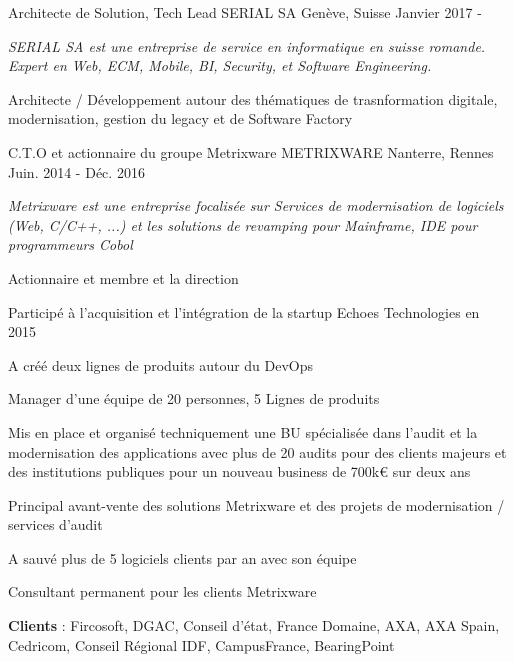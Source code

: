 

\begin{cventries}
\cventry
{Architecte de Solution, Tech Lead} %
{SERIAL SA} %
{Genève, Suisse} %
{Janvier 2017 - } %
{
	\begin{cvitems} %
		\item {\textit{SERIAL SA est une entreprise de service en informatique en suisse romande. Expert en Web, ECM, Mobile, BI, Security, et Software Engineering.}}
		\item {Architecte / Développement autour des thématiques de trasnformation digitale, modernisation, gestion du legacy et de Software Factory}
	\end{cvitems}
}
  \cventry
    {C.T.O et actionnaire du groupe Metrixware} %
    {METRIXWARE} %
    {Nanterre, Rennes} %
    {Juin. 2014 - Déc. 2016} %
    {
      \begin{cvitems} %
        \item {\textit{Metrixware est une entreprise focalisée sur Services de modernisation de logiciels (Web, C/C++, ...) et les solutions de revamping pour Mainframe, IDE pour programmeurs Cobol}}
        \item {Actionnaire et membre et la direction}
        \item {Participé à l'acquisition et l'intégration de la startup Echoes Technologies en 2015}
        \item {A créé deux lignes de produits autour du DevOps}
        \item {Manager d'une équipe de 20 personnes, 5 Lignes de produits}
        \item {Mis en place et organisé techniquement une BU spécialisée dans l'audit et la modernisation des applications avec plus de 20 audits pour des clients majeurs et des institutions publiques pour un nouveau business de 700k€ sur deux ans}
        \item {Principal avant-vente des solutions Metrixware et des projets de modernisation / services d'audit}
        \item {A sauvé plus de 5 logiciels clients par an avec son équipe}
        \item {Consultant permanent pour les clients Metrixware}
        \item {\textbf{Clients} : Fircosoft, DGAC, Conseil d'état, France Domaine, AXA, AXA Spain, Cedricom, Conseil Régional IDF, CampusFrance, BearingPoint}
      \end{cvitems}
    }


\end{cventries}
